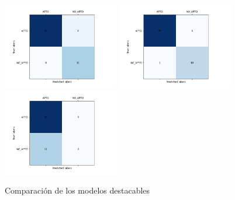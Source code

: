         \begin{figure}[!ht]
                 \centering
                 \includegraphics[width=0.45\textwidth]{img/modelo2-0.003int2_0.9166666720476415_20230603-003149.png}
                 \includegraphics[width=0.45\textwidth]{img/modelo2-0.005int2_0.9090909361839294_20230603-010653.png}
                 \centering
                 \includegraphics[width=0.45\textwidth]{img/modelo2-0.002int1_0_20230610-154306.png}
                  \caption{Comparación de los modelos destacables}
                 \label{fig:comparacion de modelos}
        \end{figure}

